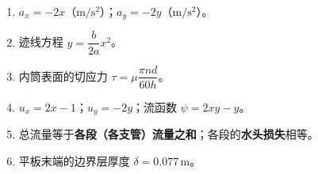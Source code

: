 \begin{enumerate}
  \item $a_x=-2x$（$\mathrm{m/s^2}$）；\quad $a_y=-2y$（$\mathrm{m/s^2}$）。

  \item 迹线方程 $y=\dfrac{b}{2a}x^{2}$。

  \item 内筒表面的切应力 $\tau=\mu\dfrac{\pi n d}{60h}$。

  \item $u_x=2x-1$；\quad $u_y=-2y$；\quad 流函数 $\psi=2xy-y$。

  \item 总流量等于\textbf{各段（各支管）流量之和}；\quad 各段的\textbf{水头损失}相等。

  \item 平板末端的边界层厚度 $\delta=0.077\,\mathrm{m}$。
\end{enumerate}

